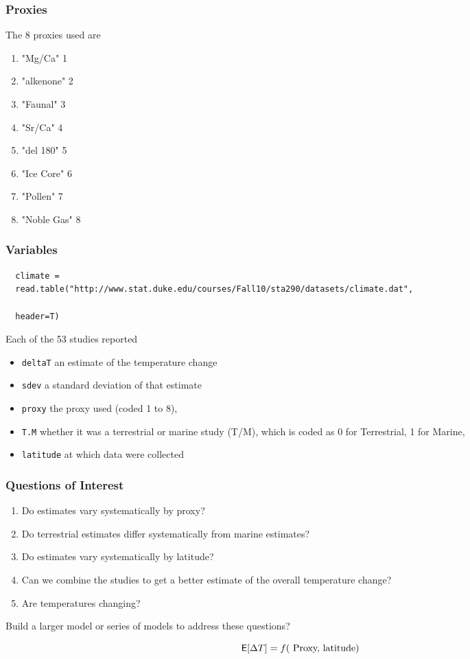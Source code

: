 \documentclass[handout]{beamer}
\begin{document}
\begin{frame}
  \frametitle{Proxies}
   The 8 proxies used are

   \begin{enumerate}
   \item    "Mg/Ca"           1
   \item    "alkenone"        2
   \item    "Faunal"          3
   \item    "Sr/Ca"           4
   \item    "del 180"         5
   \item    "Ice Core"        6
   \item    "Pollen"          7
   \item    "Noble Gas"       8
   \end{enumerate}

\end{frame}
\begin{frame}[fragile]
  \frametitle{Variables}
  \begin{tiny}
\begin{verbatim}
  climate =
  read.table("http://www.stat.duke.edu/courses/Fall10/sta290/datasets/climate.dat",

  header=T)  
\end{verbatim}
    
\end{tiny}
\pause
Each of the 53 studies reported 
\begin{itemize}
\item {\tt deltaT} an estimate of the temperature change \pause
\item {\tt sdev}  a standard deviation of that
estimate \pause
\item {\tt proxy}  the proxy used (coded 1 to 8),  \pause
\item {\tt T.M} whether it was a
terrestrial or marine study (T/M), which is coded as 0 for
Terrestrial, 1 for Marine,  \pause
\item {\tt latitude} at which data were collected 
\end{itemize}
\end{frame}

\begin{frame}
  \frametitle{Questions of Interest}
  \begin{enumerate}
  \item Do estimates vary systematically by proxy? \pause
  \item Do terrestrial estimates differ systematically from marine
    estimates? \pause
\item Do estimates vary systematically by latitude? \pause
\item Can we combine the studies to get a better estimate of the
  overall temperature change?  \pause
\item Are temperatures changing?  \pause
  \end{enumerate}

Build a larger  model or series of models to address these questions?

$$\textsf{E}[\Delta T ] = f(\text{ Proxy, latitude})$$
\end{frame}
\end{document}
